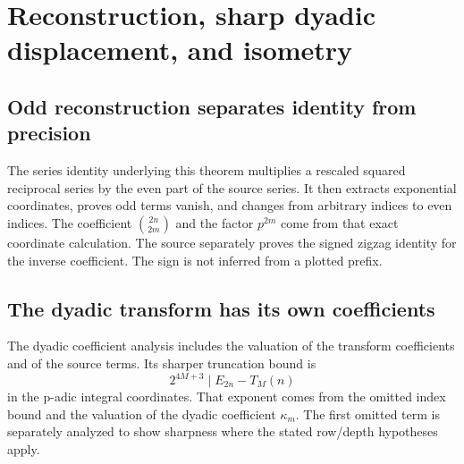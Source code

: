 \section{Reconstruction, sharp dyadic displacement, and isometry}\label{sec:dyadic}
\subsection{Odd reconstruction separates identity from precision}
The series identity underlying this theorem multiplies a rescaled squared reciprocal series by the even part of the source series. It then extracts exponential coordinates, proves odd terms vanish, and changes from arbitrary indices to even indices. The coefficient $\binom{2n}{2m}$ and the factor $p^{2m}$ come from that exact coordinate calculation. The source separately proves the signed zigzag identity for the inverse coefficient. The sign is not inferred from a plotted prefix.


\subsection{The dyadic transform has its own coefficients}
The dyadic coefficient analysis includes the valuation of the transform coefficients and of the source terms. Its sharper truncation bound is
\[
2^{4M+3}\mid E_{2n}-T_M(n)
\]
in the p-adic integral coordinates. That exponent comes from the omitted index bound and the valuation of the dyadic coefficient $\kappa_m$. The first omitted term is separately analyzed to show sharpness where the stated row/depth hypotheses apply.

